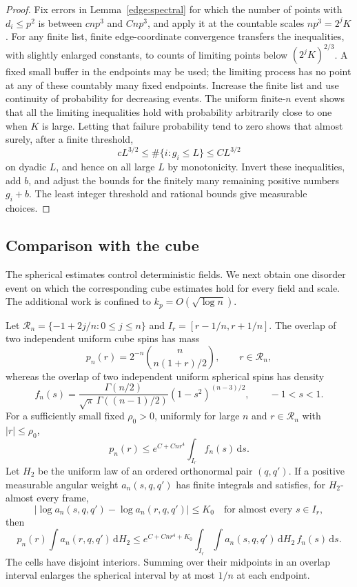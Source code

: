 \begin{proof}
Fix errors in Lemma~\ref{edge:spectral} for which the number of points
with \(d_i\le p^2\) is between \(c np^3\) and \(Cnp^3\), and apply it
at the countable scales \(np^3=2^jK\).  For any finite list, finite
edge-coordinate convergence transfers the inequalities, with slightly
enlarged constants, to counts of limiting points below
\((2^jK)^{2/3}\).  A fixed small buffer in the endpoints may be used;
the limiting process has no point at any of these countably many fixed
endpoints.  Increase the finite list and use continuity of probability
for decreasing events.  The uniform finite-\(n\) event shows that all
the limiting inequalities hold with probability arbitrarily close to one
when \(K\) is large.  Letting that failure probability tend to zero
shows that almost surely, after a finite threshold,
\[
 cL^{3/2}\le\#\{i:g_i\le L\}\le CL^{3/2}
\]
on dyadic \(L\), and hence on all large \(L\) by monotonicity.  Invert
these inequalities, add \(b\), and adjust the bounds for the finitely
many remaining positive numbers \(g_i+b\).  The least integer threshold
and rational bounds give measurable choices.
\end{proof}

\subsection{Comparison with the cube}

The spherical estimates control deterministic fields.  We next obtain
one disorder event on which the corresponding cube estimates hold for
every field and scale.  The additional work is confined to
\(k_p=O(\sqrt{\log n})\).

\begin{lemma}\label{edge:gram-cell}
Let \(\mathscr R_n=\{-1+2j/n:0\le j\le n\}\) and
\(I_r=[r-1/n,r+1/n]\).  The overlap of two independent uniform cube
spins has mass
\[
 p_n(r)=2^{-n}\binom{n}{n(1+r)/2},\qquad r\in\mathscr R_n,
\]
whereas the overlap of two independent uniform spherical spins has
density
\[
 f_n(s)=\frac{\Gamma(n/2)}{\sqrt\pi\,\Gamma((n-1)/2)}
             (1-s^2)^{(n-3)/2},\qquad -1<s<1.
\]
For a sufficiently small fixed \(\rho_0>0\), uniformly for large \(n\)
and \(r\in\mathscr R_n\) with \(|r|\le\rho_0\),
\begin{equation}\label{edge:pair-cell-mass}
 p_n(r)\le e^{C+Cnr^4}\int_{I_r}f_n(s)\,\mathrm ds.
\end{equation}
Let \(H_2\) be the uniform law of an ordered orthonormal pair
\((q,q')\).  If a positive measurable angular weight
\(a_n(s,q,q')\) has finite integrals and satisfies, for \(H_2\)-almost
every frame,
\[
 |\log a_n(s,q,q')-\log a_n(r,q,q')|\le K_0
 \quad\text{for almost every }s\in I_r,
\]
then
\begin{equation}\label{edge:pair-cell-weighted}
 p_n(r)\int a_n(r,q,q')\,\mathrm dH_2
 \le e^{C+Cnr^4+K_0}
       \int_{I_r}\!\int a_n(s,q,q')\,\mathrm dH_2\,f_n(s)\,\mathrm ds.
\end{equation}
The cells have disjoint interiors.  Summing over their midpoints in an
overlap interval enlarges the spherical interval by at most \(1/n\)
at each endpoint.
\end{lemma}

